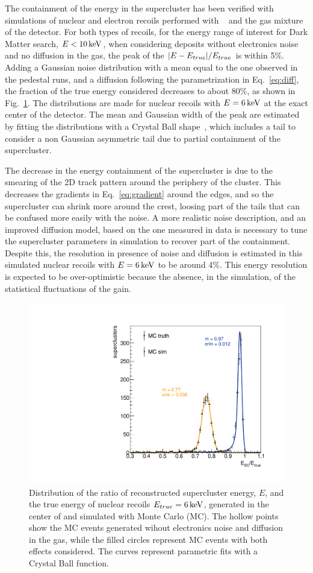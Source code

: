 The containment of the energy in the supercluster has been verified
with simulations of nuclear and electron recoils performed with
\SRIM~\cite{bib:srim} and the gas mixture of the \lemon detector.
For both types of recoils, for the energy range of interest for Dark
Matter search, \eg $E<10\,\textrm{ke\hspace{-.08em}V}$, when considering deposits without
electronics noise and no diffusion in the gas, the peak of the
$\vert E-E_{true} \vert/E_{true}$ is within 5\%. Adding a
Gaussian noise distribution with a mean equal to the one observed in
the pedestal runs, and a diffusion following the parametrization in
Eq.~\ref{eq:diff}, the fraction of the true energy considered
decreases to about 80\%, as shown in Fig.~\ref{fig:eoveretrue}. The
distributions are made for nuclear recoils with $E=6\,\textrm{ke\hspace{-.08em}V}$ at the exact
center of the \lemon detector. The mean and Gaussian width of the peak
are estimated by fitting the distributions with a Crystal Ball
shape~\cite{Oreglia:1980cs,Gaiser:1982yw}, which includes a tail to
consider a non Gaussian asymmetric tail due to partial containment of
the supercluster.

The decrease in the energy containment of the supercluster is due to
the smearing of the 2D track pattern around the periphery of the
cluster.  This decreases the gradients in Eq.~\ref{eq:gradient} around
the edges, and so the supercluster can shrink more around the crest,
loosing part of the tails that can be confused more easily with the
noise.  A more realistic noise description, and an improved diffusion
model, based on the one measured in data is necessary to tune the
supercluster parameters in simulation to recover part of the
containment. Despite this, the resolution in presence of noise and
diffusion is estimated in this simulated nuclear recoils with
$E=6\,\textrm{ke\hspace{-.08em}V}$ to be around 4\%. This energy resolution is expected to be
over-optimistic because the absence, in the simulation, of the
statistical fluctuations of the gain.
%
\begin{figure}[ht]
  \begin{center} \includegraphics[width=0.49\linewidth]{figures/eoveretrue} \caption{Distribution
    of the ratio of reconstructed supercluster energy, $E$, and the
    true energy of nuclear recoils $E_{true}=6\,\textrm{ke\hspace{-.08em}V}$, generated in the
    center of \lemon and simulated with \GEANTfour Monte Carlo
    (MC). The hollow points show the MC events generated wihout
    electronics noise and diffusion in the gas, while the filled
    circles represent MC events with both effects considered. The
    curves represent parametric fits with a Crystal Ball
    function.\label{fig:eoveretrue}} \end{center}
\end{figure}
%

